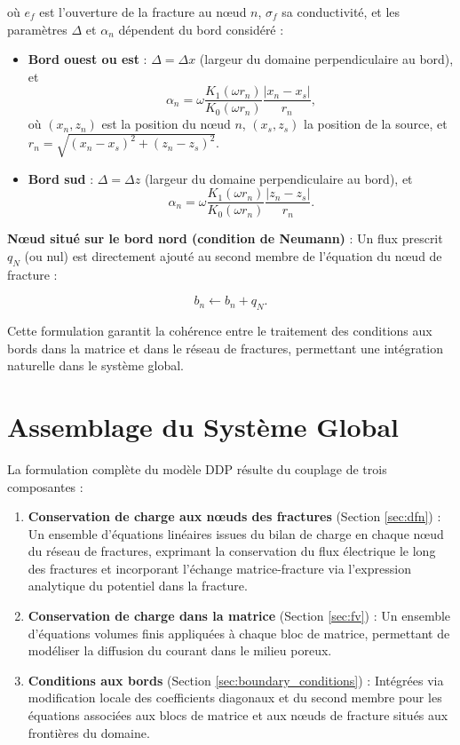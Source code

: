où $e_f$ est l'ouverture de la fracture au nœud $n$, $\sigma_f$ sa conductivité, et les paramètres $\Delta$ et $\alpha_n$ dépendent du bord considéré :
\begin{itemize}[label=$\circ$]
    \item \textbf{Bord ouest ou est} : $\Delta = \Delta x$ (largeur du domaine perpendiculaire au bord), et 
    $$\alpha_n = \omega \frac{K_1(\omega r_n)}{K_0(\omega r_n)} \frac{|x_n - x_s|}{r_n},$$
    où $(x_n, z_n)$ est la position du nœud $n$, $(x_s, z_s)$ la position de la source, et $r_n = \sqrt{(x_n-x_s)^2 + (z_n-z_s)^2}$.
    
    \item \textbf{Bord sud} : $\Delta = \Delta z$ (largeur du domaine perpendiculaire au bord), et 
    $$\alpha_n = \omega \frac{K_1(\omega r_n)}{K_0(\omega r_n)} \frac{|z_n - z_s|}{r_n}.$$
\end{itemize}

\textbf{Nœud situé sur le bord nord (condition de Neumann)} : Un flux prescrit $q_N$ (ou nul) est directement ajouté au second membre de l'équation du nœud de fracture :

\begin{equation}
b_n\leftarrow b_n+q_N.
\label{eq:fracture_neumann_bc}
\end{equation}

Cette formulation garantit la cohérence entre le traitement des conditions aux bords dans la matrice et dans le réseau de fractures, permettant une intégration naturelle dans le système global.

\section{Assemblage du Système Global}
\label{sec:global_system}

La formulation complète du modèle DDP résulte du couplage de trois composantes :

\begin{enumerate}
    \item \textbf{Conservation de charge aux nœuds des fractures} (Section \ref{sec:dfn}) : 
    Un ensemble d'équations linéaires issues du bilan de charge en chaque nœud du réseau de fractures, exprimant la conservation du flux électrique le long des fractures et incorporant l'échange matrice-fracture via l'expression analytique du potentiel dans la fracture.
    
    \item \textbf{Conservation de charge dans la matrice} (Section \ref{sec:fv}) : 
    Un ensemble d'équations volumes finis appliquées à chaque bloc de matrice, permettant de modéliser la diffusion du courant dans le milieu poreux.
    
    \item \textbf{Conditions aux bords} (Section \ref{sec:boundary_conditions}) : 
    Intégrées via modification locale des coefficients diagonaux et du second membre pour les équations associées aux blocs de matrice et aux nœuds de fracture situés aux frontières du domaine.
\end{enumerate}

